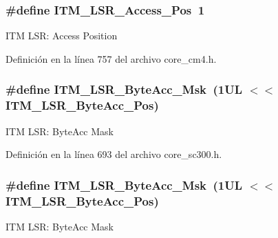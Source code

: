 \subsubsection[{\texorpdfstring{I\+T\+M\+\_\+\+L\+S\+R\+\_\+\+Access\+\_\+\+Pos}{ITM_LSR_Access_Pos}}]{\setlength{\rightskip}{0pt plus 5cm}\#define I\+T\+M\+\_\+\+L\+S\+R\+\_\+\+Access\+\_\+\+Pos~1}\hypertarget{group___c_m_s_i_s___i_t_m_ga144a49e12b83ad9809fdd2769094fdc0}{}\label{group___c_m_s_i_s___i_t_m_ga144a49e12b83ad9809fdd2769094fdc0}
I\+TM L\+SR\+: Access Position 

Definición en la línea 757 del archivo core\+\_\+cm4.\+h.

\subsubsection[{\texorpdfstring{I\+T\+M\+\_\+\+L\+S\+R\+\_\+\+Byte\+Acc\+\_\+\+Msk}{ITM_LSR_ByteAcc_Msk}}]{\setlength{\rightskip}{0pt plus 5cm}\#define I\+T\+M\+\_\+\+L\+S\+R\+\_\+\+Byte\+Acc\+\_\+\+Msk~(1\+U\+L $<$$<$ I\+T\+M\+\_\+\+L\+S\+R\+\_\+\+Byte\+Acc\+\_\+\+Pos)}\hypertarget{group___c_m_s_i_s___i_t_m_ga91f492b2891bb8b7eac5b58de7b220f4}{}\label{group___c_m_s_i_s___i_t_m_ga91f492b2891bb8b7eac5b58de7b220f4}
I\+TM L\+SR\+: Byte\+Acc Mask 

Definición en la línea 693 del archivo core\+\_\+sc300.\+h.

\subsubsection[{\texorpdfstring{I\+T\+M\+\_\+\+L\+S\+R\+\_\+\+Byte\+Acc\+\_\+\+Msk}{ITM_LSR_ByteAcc_Msk}}]{\setlength{\rightskip}{0pt plus 5cm}\#define I\+T\+M\+\_\+\+L\+S\+R\+\_\+\+Byte\+Acc\+\_\+\+Msk~(1\+U\+L $<$$<$ I\+T\+M\+\_\+\+L\+S\+R\+\_\+\+Byte\+Acc\+\_\+\+Pos)}\hypertarget{group___c_m_s_i_s___i_t_m_ga91f492b2891bb8b7eac5b58de7b220f4}{}\label{group___c_m_s_i_s___i_t_m_ga91f492b2891bb8b7eac5b58de7b220f4}
I\+TM L\+SR\+: Byte\+Acc Mask 

